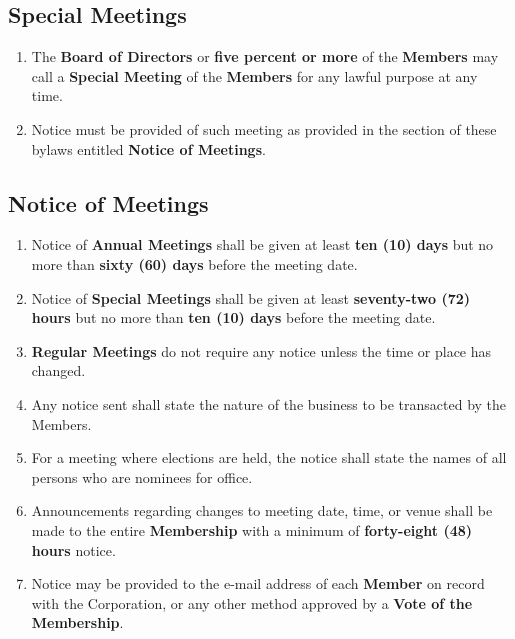 \documentclass{article}
\begin{document}
\subsection{Special Meetings}
\begin{enumerate}
    \item The \textbf{Board of Directors} or \textbf{five percent or more} of the \textbf{Members} may call a \textbf{Special Meeting} of the \textbf{Members} for any lawful purpose at any time.
    \item Notice must be provided of such meeting as provided in the section of these bylaws entitled \textbf{Notice of Meetings}.
\end{enumerate}

\subsection{Notice of Meetings}
\begin{enumerate}
    \item Notice of \textbf{Annual Meetings} shall be given at least \textbf{ten (10) days} but no more than \textbf{sixty (60) days} before the meeting date.
    \item Notice of \textbf{Special Meetings} shall be given at least \textbf{seventy-two (72) hours} but no more than \textbf{ten (10) days} before the meeting date.
    \item \textbf{Regular Meetings} do not require any notice unless the time or place has changed.
    \item Any notice sent shall state the nature of the business to be transacted by the Members.
    \item For a meeting where elections are held, the notice shall state the names of all persons who are nominees for office.
    \item Announcements regarding changes to meeting date, time, or venue shall be made to the entire \textbf{Membership} with a minimum of \textbf{forty-eight (48) hours} notice.
    \item Notice may be provided to the e-mail address of each \textbf{Member} on record with the Corporation, or any other method approved by a \textbf{Vote of the Membership}.
\end{enumerate}
\end{document}

